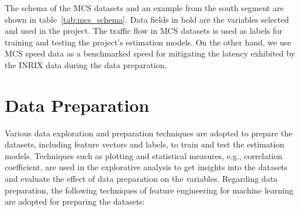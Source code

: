 \documentclass[english]{kththesis}
\begin{document}
The schema of the MCS datasets and an example from the south segment are shown in table~\ref{tab:mcs_schema}. Data fields in bold are the variables selected and used in the project. The traffic flow in MCS datasets is used as labels for training and testing the project's estimation models. On the other hand, we use MCS speed data as a benchmarked speed for mitigating the latency exhibited by the INRIX data during the data preparation.

\section{Data Preparation}
\label{sec:dataPreparation}
Various data exploration and preparation techniques are adopted to prepare the datasets, including feature vectors and labels, to train and test the estimation models. Techniques such as plotting and statistical measures, e.g., correlation coefficient, are used in the explorative analysis to get insights into the datasets and evaluate the effect of data preparation on the variables. Regarding data preparation, the following techniques of feature engineering for machine learning are adopted for preparing the datasets:
\end{document}
